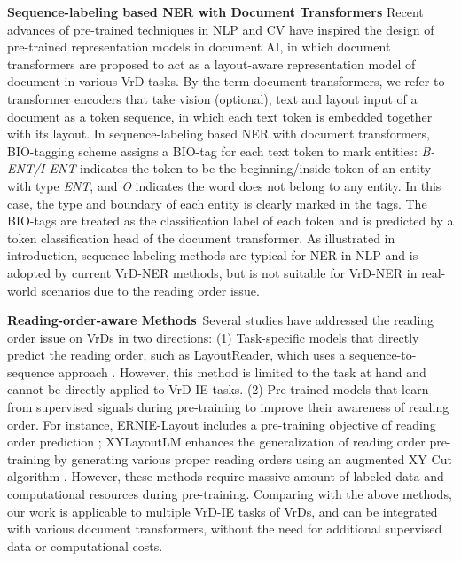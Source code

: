 \documentclass[11pt]{article}
\begin{document}
\textbf{Sequence-labeling based NER with Document Transformers}
Recent advances of pre-trained techniques in NLP \citep{kenton2019bert,zhang2019ernie} and CV \citep{dosovitskiy2020image,li2022dit} have inspired the design of pre-trained representation models in document AI, in which document transformers \citep{xu2020layoutlm,xu2021layoutlmv2,huang2022layoutlmv3,li2021structurallm,li2021structext,hong2022bros,wang2022lilt,tu2023layoutmask} are proposed to act as a layout-aware representation model of document in various VrD tasks. 
By the term document transformers, we refer to transformer encoders that take vision (optional), text and layout input of a document as a token sequence, in which each text token is embedded together with its layout.
In sequence-labeling based NER with document transformers, BIO-tagging scheme assigns a BIO-tag for each text token to mark entities: \textit{B-ENT/I-ENT} indicates the token to be the beginning/inside token of an entity with type \textit{ENT}, and \textit{O} indicates the word does not belong to any entity. In this case, the type and boundary of each entity is clearly marked in the tags. The BIO-tags are treated as the classification label of each token and is predicted by a token classification head of the document transformer.
As illustrated in introduction, sequence-labeling methods are typical for NER in NLP and is adopted by current VrD-NER methods, but is not suitable for VrD-NER in real-world scenarios due to the reading order issue. 

\noindent \textbf{Reading-order-aware Methods}\ 
Several studies have addressed the reading order issue on VrDs in two directions: (1) Task-specific models that directly predict the reading order, such as LayoutReader, which uses a sequence-to-sequence approach \citep{wang2021layoutreader}. However, this method is limited to the task at hand and cannot be directly applied to VrD-IE tasks. (2) Pre-trained models that learn from supervised signals during pre-training to improve their awareness of reading order. For instance, ERNIE-Layout includes a pre-training objective of reading order prediction \citep{peng2022ernie}; XYLayoutLM enhances the generalization of reading order pre-training by generating various proper reading orders using an augmented XY Cut algorithm \citep{gu2022xylayoutlm}. However, these methods require massive amount of labeled data and computational resources during pre-training. 
Comparing with the above methods, our work is applicable to multiple VrD-IE tasks of VrDs, and can be integrated with various document transformers, without the need for additional supervised data or computational costs. 
\end{document}
